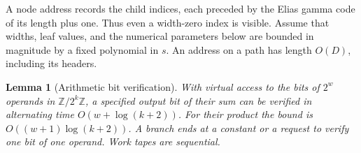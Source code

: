 \documentclass[11pt]{article}
\newtheorem{lemma}[theorem]{Lemma}
\theoremstyle{definition}
\theoremstyle{remark}
\newcommand{\Z}{\mathbb Z}
\begin{document}
A node address records the child indices, each preceded by the Elias gamma code of its length plus one. Thus even a width-zero index is visible. Assume that widths, leaf values, and the numerical parameters below are bounded in magnitude by a fixed polynomial in $s$. An address on a path has length $O(D)$, including its headers.

\begin{lemma}[Arithmetic bit verification]\label{lem:arithmetic}
With virtual access to the bits of $2^w$ operands in $\Z/2^k\Z$, a specified output bit of their sum can be verified in alternating time $O(w+\log(k+2))$. For their product the bound is $O((w+1)\log(k+2))$. A branch ends at a constant or a request to verify one bit of one operand. Work tapes are sequential.
\end{lemma}
\end{document}
